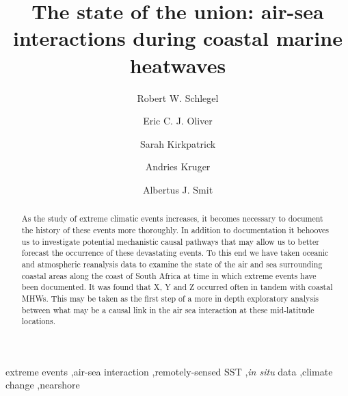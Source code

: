 \documentclass[a4paper,10pt,review]{elsarticle}
\begin{document}
\begin{frontmatter}

\title{The state of the union: air-sea interactions during coastal marine heatwaves}

\author[firstaddress]{Robert W. Schlegel}
\author[secondaddress,thirdaddress]{Eric C. J. Oliver}
\author[fourthaddress]{Sarah Kirkpatrick}
\author[fifthaddress]{Andries Kruger}
\author[firstaddress]{Albertus J. Smit}



\address[firstaddress]{Department of Biodiversity and Conservation Biology, University of the Western Cape, Private Bag X17, Bellville 7535, South Africa}

\address[secondaddress]{ARC Centre of Excellence for Climate System Science, Australia}

\address[thirdaddress]{Institute for Marine and Antarctic Studies, University of Tasmania, Hobart, Australia}

\address[fourthaddress]{UWA Oceans Institute and School of Plant Biology, The University of Western Australia, Crawley, 6009 Western Australia, Australia}

\address[fifthaddress]{SAWS, South Africa}

\begin{abstract}
As the study of extreme climatic events increases, it becomes necessary to document the history of these events more thoroughly. In addition to documentation it behooves us to investigate potential mechanistic causal pathways that may allow us to better forecast the occurrence of these devastating events. To this end we have taken oceanic and atmospheric reanalysis data to examine the state of the air and sea surrounding coastal areas along the coast of South Africa at time in which extreme events have been documented. It was found that X, Y and Z occurred often in tandem with coastal MHWs. This may be taken as the first step of a more in depth exploratory analysis between what may be a causal link in the air sea interaction at these mid-latitude locations.
\end{abstract}

\begin{keyword}
extreme events \sep air-sea interaction \sep remotely-sensed SST \sep \emph{in situ} data \sep climate change \sep nearshore
\end{keyword}

\end{frontmatter}
\end{document}
